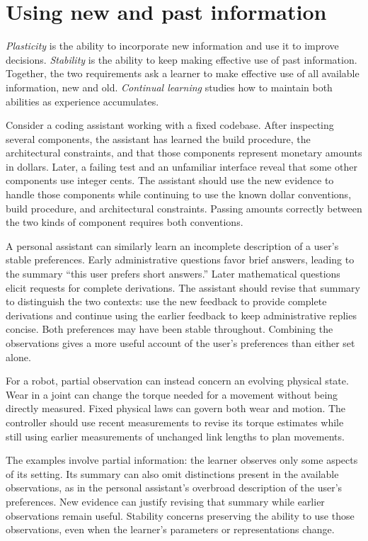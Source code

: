 \documentclass[11pt,twoside]{article}
\theoremstyle{definition}
\theoremstyle{remark}
\begin{document}
\section{Using new and past information}
\label{sec:motivation}

\emph{Plasticity} is the ability to incorporate new information and use it
to improve decisions. \emph{Stability} is the ability to keep making
effective use of past information. Together, the two requirements ask a
learner to make effective use of all available information, new and old.
\emph{Continual learning} studies how to maintain both abilities as
experience accumulates.

Consider a coding assistant working with a fixed codebase. After inspecting
several components, the assistant has learned the build procedure, the
architectural constraints, and that those components represent monetary
amounts in dollars. Later, a failing test and an unfamiliar interface
reveal that some other components use integer cents. The assistant should
use the new evidence to handle those components while continuing to use
the known dollar conventions, build procedure, and architectural constraints.
Passing amounts correctly between the two kinds of component requires
both conventions.

A personal assistant can similarly learn an incomplete description of a
user's stable preferences. Early administrative questions favor brief
answers, leading to the summary ``this user prefers short answers.''
Later mathematical questions elicit requests for complete derivations.
The assistant should revise that summary to distinguish the two contexts:
use the new feedback to provide complete derivations and continue using
the earlier feedback to keep administrative replies concise. Both
preferences may have been stable throughout. Combining the observations
gives a more useful account of the user's preferences than either set alone.

For a robot, partial observation can instead concern an evolving physical
state. Wear in a joint can change the torque needed for a movement without
being directly measured. Fixed physical laws can govern both wear and
motion. The controller should use recent measurements to revise its torque
estimates while still using earlier measurements of unchanged link lengths
to plan movements.

The examples involve partial information: the learner observes only some
aspects of its setting. Its summary can also omit distinctions present in
the available observations, as in the personal assistant's overbroad
description of the user's preferences. New evidence can justify revising
that summary while earlier observations remain useful. Stability concerns
preserving the ability to use those observations, even when the learner's
parameters or representations change.
\end{document}
